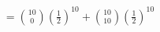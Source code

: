 \documentclass[preview]{standalone}
\begin{document}
\begin{align*}
= \binom{10}{0}\left(\frac{1}{2}\right)^{10} + \binom{10}{10}\left(\frac{1}{2}\right)^{10}
\end{align*}
\end{document}
